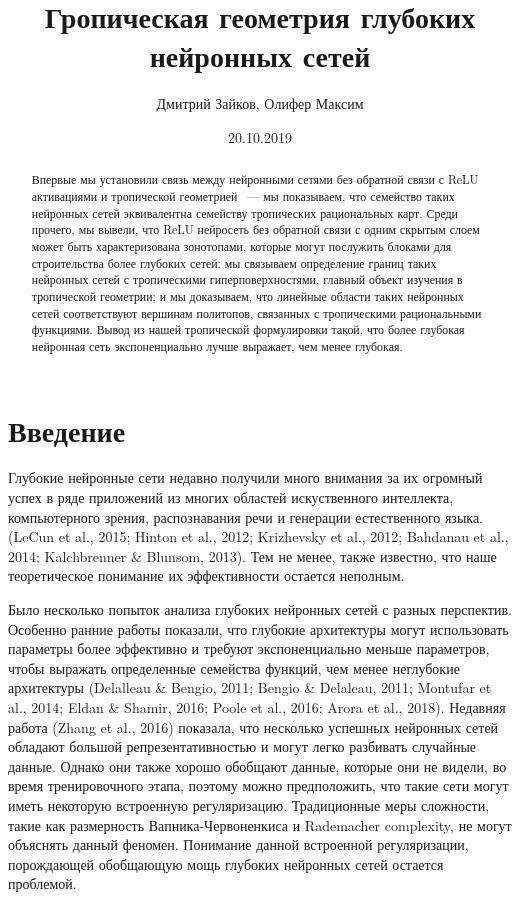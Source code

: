 \documentclass[russian]{lecture-notes}
\title{Гропическая геометрия глубоких нейронных сетей}
\author{Дмитрий Зайков, Олифер Максим}
\date{20.10.2019}
\begin{document}
	\begin{abstract}
		Впервые мы установили связь между нейронными сетями без обратной связи с ReLU активациями и тропической геометрией ~--- мы показываем, что семейство таких нейронных сетей эквивалентна семейству тропических рациональных карт. Среди прочего, мы вывели, что ReLU нейросеть без обратной связи с одним скрытым слоем может быть характеризована зонотопами, которые могут послужить блоками для строительства более глубоких сетей; мы связываем определение границ таких нейронных сетей с тропическими гиперповерхностями, главный объект изучения в тропической геометрии; и мы доказываем, что линейные области таких нейронных сетей соответствуют вершинам политопов, связанных с тропическими рациональными функциями. Вывод из нашей тропической формулировки такой, что более глубокая нейронная сеть экспоненциально лучше выражает, чем менее глубокая.
	\end{abstract}

	\section{Введение}
	
	Глубокие нейронные сети недавно получили много внимания за их огромный успех в ряде приложений из многих областей искуственного интеллекта, компьютерного зрения, распознавания речи и генерации естественного языка. (LeCun et al., 2015; Hinton et al., 2012; Krizhevsky et al., 2012; Bahdanau et al., 2014; Kalchbrenner \& Blunsom, 2013). Тем не менее, также известно, что наше теоретическое понимание их эффективности остается неполным.
	
	Было несколько попыток анализа глубоких нейронных сетей с разных перспектив. Особенно ранние работы показали, что глубокие архитектуры могут использовать параметры более эффективно и требуют экспоненциально меньше параметров, чтобы выражать определенные семейства функций, чем менее неглубокие архитектуры (Delalleau \& Bengio, 2011; Bengio \& Delaleau, 2011; Montufar et al., 2014; Eldan \& Shamir, 2016; Poole et al., 2016; Arora et al., 2018). Недавняя работа (Zhang et al., 2016) показала, что несколько успешных нейронных сетей обладают большой репрезентативностью и могут легко разбивать случайные данные. Однако они также хорошо обобщают данные, которые они не видели, во время тренировочного этапа, поэтому можно предположить, что такие сети могут иметь некоторую встроенную регуляризацию. Традиционные меры сложности, такие как размерность Вапника-Червоненкиса и Rademacher complexity, не могут объяснять данный феномен. Понимание данной встроенной регуляризации, порождающей обобщающую мощь глубоких нейронных сетей остается проблемой.
	
\end{document}

